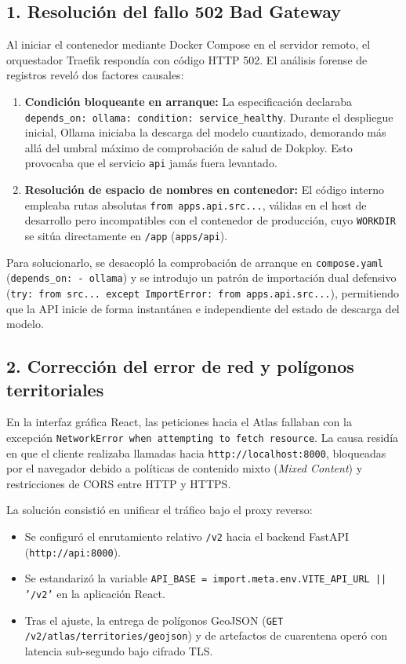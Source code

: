 \documentclass[11pt,a4paper]{article}
\begin{document}
\subsection{1. Resoluci\'on del fallo 502 Bad Gateway}
Al iniciar el contenedor mediante Docker Compose en el servidor remoto, el orquestador Traefik respond\'ia con c\'odigo HTTP 502. El an\'alisis forense de registros revel\'o dos factores causales:
\begin{enumerate}[leftmargin=*]
    \item \textbf{Condici\'on bloqueante en arranque:} La especificaci\'on declaraba \texttt{depends\_on: ollama: condition: service\_healthy}. Durante el despliegue inicial, Ollama iniciaba la descarga del modelo cuantizado, demorando m\'as all\'a del umbral m\'aximo de comprobaci\'on de salud de Dokploy. Esto provocaba que el servicio \texttt{api} jam\'as fuera levantado.
    \item \textbf{Resoluci\'on de espacio de nombres en contenedor:} El c\'odigo interno empleaba rutas absolutas \texttt{from apps.api.src...}, v\'alidas en el host de desarrollo pero incompatibles con el contenedor de producci\'on, cuyo \texttt{WORKDIR} se sit\'ua directamente en \texttt{/app} (\texttt{apps/api}).
\end{enumerate}
Para solucionarlo, se desacopl\'o la comprobaci\'on de arranque en \texttt{compose.yaml} (\texttt{depends\_on: - ollama}) y se introdujo un patr\'on de importaci\'on dual defensivo (\texttt{try: from src... except ImportError: from apps.api.src...}), permitiendo que la API inicie de forma instant\'anea e independiente del estado de descarga del modelo.

\subsection{2. Correcci\'on del error de red y pol\'igonos territoriales}
En la interfaz gr\'afica React, las peticiones hacia el Atlas fallaban con la excepci\'on \texttt{NetworkError when attempting to fetch resource}. La causa resid\'ia en que el cliente realizaba llamadas hacia \texttt{http://localhost:8000}, bloqueadas por el navegador debido a pol\'iticas de contenido mixto (\textit{Mixed Content}) y restricciones de CORS entre HTTP y HTTPS.

La soluci\'on consisti\'o en unificar el tr\'afico bajo el proxy reverso:
\begin{itemize}[leftmargin=*]
    \item Se configur\'o el enrutamiento relativo \texttt{/v2} hacia el backend FastAPI (\texttt{http://api:8000}).
    \item Se estandariz\'o la variable \texttt{API\_BASE = import.meta.env.VITE\_API\_URL || '/v2'} en la aplicaci\'on React.
    \item Tras el ajuste, la entrega de pol\'igonos GeoJSON (\texttt{GET /v2/atlas/territories/geojson}) y de artefactos de cuarentena oper\'o con latencia sub-segundo bajo cifrado TLS.
\end{itemize}
\end{document}
